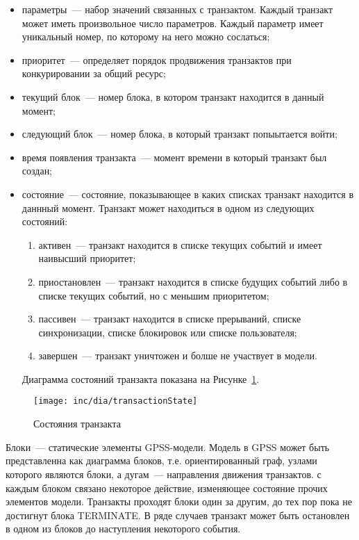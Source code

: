 \begin{itemize}
\item параметры~--- набор значений связанных с транзактом. Каждый транзакт может иметь произвольное число параметров. Каждый параметр имеет уникальный номер, по которому на него можно сослаться;
\item приоритет~--- определяет порядок продвижения транзактов при конкурировании за общий ресурс;
\item текущий блок~--- номер блока, в котором транзакт находится в данный момент;
\item следующий блок~--- номер блока, в который транзакт попыытается войти;
\item время появления транзакта~---  момент времени в который транзакт был создан;
\item состояние~--- состояние, показывающее в каких списках транзакт находится в даннный момент. Транзакт может находиться в одном из следующих состояний:
    \begin{enumerate}
    \item активен~--- транзакт находится в списке текущих событий и имеет наивысший приоритет;
    \item приостановлен~--- транзакт находится в списке будущих событий либо в списке текущих событий, но с меньшим приоритетом;
    \item пассивен~--- транзакт находится в списке прерываний, списке синхронизации, списке блокировок или списке пользователя;
    \item завершен~--- транзакт уничтожен и болше не участвует в модели.
    \end{enumerate}
    Диаграмма состояний транзакта показана на Рисунке~\ref{fig:transactionState}.
\end{itemize}


\begin{figure}[ht]
  \centering
  \texttt{[image: inc/dia/transactionState]}
  \caption{Состояния транзакта}
  \label{fig:transactionState}
\end{figure}


Блоки~--- статические элементы GPSS-модели. Модель в GPSS может быть представленна как диаграмма блоков, т.е. ориентированный граф, узлами которого являются блоки, а дугам~--- направления движения транзактов. с каждым блоком связано некоторое действие, изменяющее состояние прочих элементов модели. Транзакты проходят блоки один за другим, до тех пор пока не достигнут блока TERMINATE. В ряде случаев транзакт может быть остановлен в одном из блоков до наступления некоторого события.


